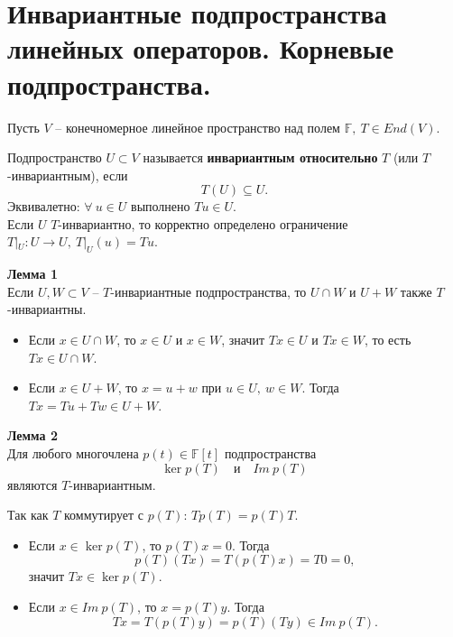 \documentclass[14pt]{extreport}
\begin{document}
    \chapter{Инвариантные подпространства линейных операторов. Корневые подпространства.}

    \begin{defbox}
        Пусть $V$ – конечномерное линейное пространство над полем $\mathbb{F},\ T \in End(V)$.

        Подпространство $U \subset V$ называется \textbf{инвариантным относительно} $T$ (или $T$-инвариантным), если
        \[
        T(U) \subseteq U.
        \]
        Эквивалетно: $\forall\ u \in U$ выполнено $Tu \in U$.\\
        Если $U$ $T$-инвариантно, то корректно определено ограничение $T|_U: U \rightarrow U,\ T|_U(u) = Tu$.
    \end{defbox}

    \begin{thbox}
        \textbf{Лемма 1}\\
        Если $U,W \subset V$ – $T$-инвариантные подпространства, то $U \cap W$ и $U+W$ также $T$-инвариантны.
    \end{thbox}
    \begin{prbox}
        \begin{itemize}
            \item Если $x \in U \cap W$, то $x \in U$ и $x \in W$, значит $Tx \in U$ и $Tx \in W$, то есть $Tx \in U \cap W$.
            \item Если $x \in U+W$, то $x = u + w$ при $u \in U,\ w \in W $. Тогда $Tx = Tu + Tw \in U+W$.
        \end{itemize}
    \end{prbox}

    \begin{thbox}
        \textbf{Лемма 2}\\
        Для любого многочлена $p(t) \in \mathbb{F}[t]$ подпространства
        \[
        \ker p(T) \quad \text{и} \quad Im\ p(T)
        \]
        являются $T$-инвариантным.
    \end{thbox}
    \begin{prbox}
        Так как $T$ коммутирует с $p(T)$: $Tp(T) = p(T)T$.
        \begin{itemize}
            \item Если $x \in \ker p(T)$, то $p(T)x = 0$. Тогда
            \[
            p(T)(Tx) = T(p(T)x) = T0 = 0,
            \]
            значит $Tx \in \ker p(T).$
            \item Если $x \in Im\ p(T)$, то $x = p(T)y$. Тогда
            \[
            Tx = T(p(T)y) = p(T)(Ty) \in Im\ p(T).
            \]
        \end{itemize}
    \end{prbox}
\end{document}
